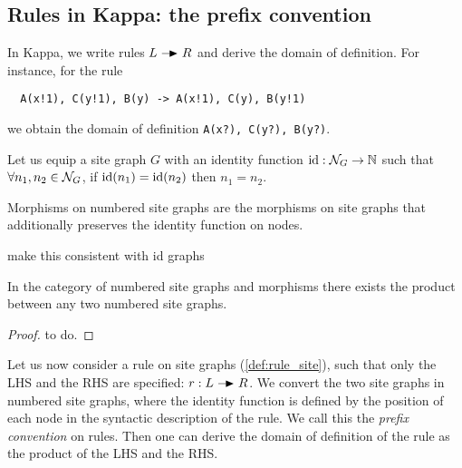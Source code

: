 \subsection{Rules in Kappa: the prefix convention}
\label{app:prefix_convention}

In Kappa, we write rules $L\action R$ and derive the domain of definition. For instance, for the rule
\begin{verbatim}
  A(x!1), C(y!1), B(y) -> A(x!1), C(y), B(y!1)
\end{verbatim}
we obtain the domain of definition \verb|A(x?), C(y?), B(y?)|.


\begin{definition}
  Let us equip a site graph $G$ with an identity function $\text{id}:\mathcal{N}_G\to \mathbb{N}$ such that $\forall n_1, n_2\in\mathcal{N}_G$, if $\text{id}(n_1)=\text{id}(n_2)$ then $n_1 = n_2$.

  Morphisms on numbered site graphs are the morphisms on site graphs that additionally preserves the identity function on nodes.
\end{definition}

\begin{mdframed}[backgroundcolor=blue!20]
make this consistent with id graphs
\end{mdframed}


\begin{lemma}
  In the category of numbered site graphs and morphisms there exists the product between any two numbered site graphs.
\end{lemma}
\begin{proof}
  to do.
\end{proof}

Let us now consider a rule on site graphs (\autoref{def:rule_site}), such that only the LHS and the RHS are specified: $r:L\action R$. We convert the two site graphs in numbered site graphs, where the identity function is defined by the position of each node in the syntactic description of the rule. We call this the \emph{prefix convention} on rules. Then one can derive the domain of definition of the rule as the product of the LHS and the RHS.
